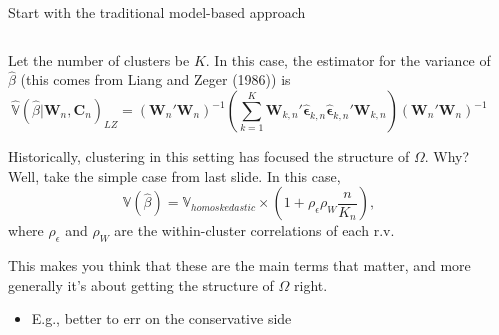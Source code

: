 \documentclass[notes,11pt, aspectratio=169]{beamer}
\newenvironment{wideitemize}{\itemize\addtolength{\itemsep}{10pt}}{\enditemize}
\begin{document}
 
\begin{frame}{Start with the traditional model-based approach}
\begin{columns}[T] %
\begin{column}{.8\textwidth}
  \begin{wideitemize}
  \item Let the number of clusters be $K$. In this case, the
    estimator for the variance of $\hat{\beta}$ (this comes from Liang
    and Zeger (1986)) is
    \begin{equation}
      \hat{\mathbb{V}}(\hat{\beta} |\mathbf{W}_{n}, \mathbf{C}_{n})_{LZ} = (\mathbf{W}_{n}'\mathbf{W}_{n})^{-1}\left(\sum_{k=1}^{K}\mathbf{W}_{k,n}'\hat{\boldsymbol{\epsilon}}_{k,n}\hat{\boldsymbol{\epsilon}}_{k,n}'\boldsymbol{W}_{k,n}\right) (\mathbf{W}_{n}'\mathbf{W}_{n})^{-1}
    \end{equation}

  \item Historically, clustering in this setting has focused the structure of $\Omega$. Why? Well, take the simple case from last slide. In this case,
    \begin{equation}
      \mathbb{V}(\hat{\beta}) = \mathbb{V}_{homoskedastic}\times \left( 1+ \rho_{\epsilon}\rho_{W}\frac{n}{K_{n}}\right),
    \end{equation}
    where $\rho_{\epsilon}$ and $\rho_{W}$ are the within-cluster correlations of each r.v.
    \vspace{-8pt}
  \item This makes you think that these are the main terms that
    matter, and more generally it's about getting the structure of
    $\Omega$ right.
    \begin{itemize}
  \item E.g., better to err on the conservative side    
    \end{itemize}
  \end{wideitemize}
  \end{column}%
  \hfill%
  \begin{column}{.5\textwidth}
  \end{column}
\end{columns}
\end{frame}
\end{document}
